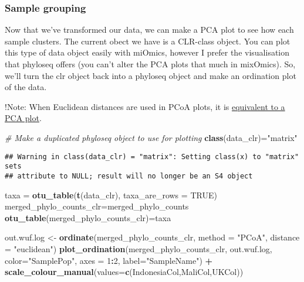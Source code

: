 \documentclass[]{article}
\newenvironment{Shaded}{\begin{snugshade}}{\end{snugshade}}
\newcommand{\CommentTok}[1]{\textcolor[rgb]{0.56,0.35,0.01}{\textit{#1}}}
\newcommand{\DataTypeTok}[1]{\textcolor[rgb]{0.13,0.29,0.53}{#1}}
\newcommand{\DecValTok}[1]{\textcolor[rgb]{0.00,0.00,0.81}{#1}}
\newcommand{\KeywordTok}[1]{\textcolor[rgb]{0.13,0.29,0.53}{\textbf{#1}}}
\newcommand{\NormalTok}[1]{#1}
\newcommand{\OperatorTok}[1]{\textcolor[rgb]{0.81,0.36,0.00}{\textbf{#1}}}
\newcommand{\OtherTok}[1]{\textcolor[rgb]{0.56,0.35,0.01}{#1}}
\newcommand{\StringTok}[1]{\textcolor[rgb]{0.31,0.60,0.02}{#1}}
\begin{document}
\hypertarget{sample-grouping}{%
\subsubsection{Sample grouping}\label{sample-grouping}}

Now that we've transformed our data, we can make a PCA plot to see how
each sample clusters. The current obect we have is a CLR-class object.
You can plot this type of data object easily with miOmics, however I
prefer the visualisation that phyloseq offers (you can't alter the PCA
plots that much in mixOmics). So, we'll turn the clr object back into a
phyloseq object and make an ordination plot of the data.

!Note: When Euclidean distances are used in PCoA plots, it is
\href{http://ordination.okstate.edu/overview.htm}{equivalent to a PCA
plot}.

\begin{Shaded}
\begin{Highlighting}[]
\CommentTok{# Make a duplicated phyloseq object to use for plotting}
\KeywordTok{class}\NormalTok{(data_clr)=}\StringTok{"matrix"}
\end{Highlighting}
\end{Shaded}

\begin{verbatim}
## Warning in class(data_clr) = "matrix": Setting class(x) to "matrix" sets
## attribute to NULL; result will no longer be an S4 object
\end{verbatim}

\begin{Shaded}
\begin{Highlighting}[]
\NormalTok{taxa =}\StringTok{ }\KeywordTok{otu_table}\NormalTok{(}\KeywordTok{t}\NormalTok{(data_clr), }\DataTypeTok{taxa_are_rows =} \OtherTok{TRUE}\NormalTok{)}
\NormalTok{merged_phylo_counts_clr=merged_phylo_counts}
\KeywordTok{otu_table}\NormalTok{(merged_phylo_counts_clr)=taxa}

\NormalTok{out.wuf.log <-}\StringTok{ }\KeywordTok{ordinate}\NormalTok{(merged_phylo_counts_clr, }\DataTypeTok{method =} \StringTok{"PCoA"}\NormalTok{, }\DataTypeTok{distance =} \StringTok{"euclidean"}\NormalTok{)}
\KeywordTok{plot_ordination}\NormalTok{(merged_phylo_counts_clr, out.wuf.log, }\DataTypeTok{color=}\StringTok{"SamplePop"}\NormalTok{, }\DataTypeTok{axes =} \DecValTok{1}\OperatorTok{:}\DecValTok{2}\NormalTok{, }\DataTypeTok{label=}\StringTok{"SampleName"}\NormalTok{) }\OperatorTok{+}\StringTok{ }\KeywordTok{scale_colour_manual}\NormalTok{(}\DataTypeTok{values=}\KeywordTok{c}\NormalTok{(IndonesiaCol,MaliCol,UKCol))}
\end{Highlighting}
\end{Shaded}
\end{document}
